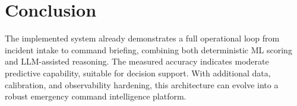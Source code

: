 \documentclass[12pt,a4paper]{article}
\begin{document}
\section{Conclusion}
The implemented system already demonstrates a full operational loop from incident intake to command briefing, combining both deterministic ML scoring and LLM-assisted reasoning. The measured accuracy indicates moderate predictive capability, suitable for decision support. With additional data, calibration, and observability hardening, this architecture can evolve into a robust emergency command intelligence platform.
\end{document}
